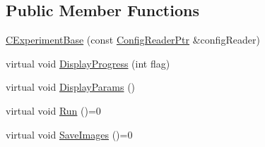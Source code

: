 \subsection*{Public Member Functions}
\begin{DoxyCompactItemize}
\item 
\hyperlink{class_q_s_t_e_m_1_1_c_experiment_base_a392b041f23ccee81239c83801931a40f}{C\-Experiment\-Base} (const \hyperlink{namespace_q_s_t_e_m_af9424707fe9f6503298f49b41304bd35}{Config\-Reader\-Ptr} \&config\-Reader)
\item 
virtual void \hyperlink{class_q_s_t_e_m_1_1_c_experiment_base_a4f941cd42b005bb029b8ac9369083be0}{Display\-Progress} (int flag)
\item 
virtual void \hyperlink{class_q_s_t_e_m_1_1_c_experiment_base_a836c6a96530d2c5c6ba235fc71adc160}{Display\-Params} ()
\item 
virtual void \hyperlink{class_q_s_t_e_m_1_1_c_experiment_base_a2d9b75bce6825d2539b8a0ed4b62c558}{Run} ()=0
\item 
virtual void \hyperlink{class_q_s_t_e_m_1_1_c_experiment_base_a3a19c71c865d60e0a500ba9b837aa89f}{Save\-Images} ()=0
\end{DoxyCompactItemize}
